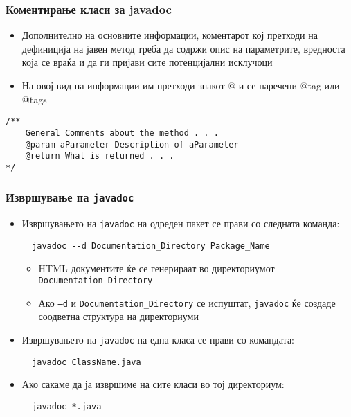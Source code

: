 \begin{frame}[fragile]\frametitle{Коментирање класи за javadoc}

\begin{itemize}
\item
  Дополнително на основните информации, коментарот кој претходи на дефиниција
  на јавен метод треба да содржи опис на параметрите, вредноста која се враќа
  и да ги пријави сите потенцијални исклучоци
\item
  На овој вид на информации им претходи знакот @ и се наречени @tag или @tags
\end{itemize}
\begin{lstlisting}
/** 
	General Comments about the method . . . 
    @param aParameter Description of aParameter 
    @return What is returned . . .
*/
\end{lstlisting}  
\end{frame}

\begin{frame}[fragile]\frametitle{Извршување на \texttt{javadoc}}

\begin{itemize}
\item
  Извршувањето на \texttt{javadoc} на одреден пакет се прави со следната
  команда: 
  \begin{verbatim}
  javadoc --d Documentation_Directory Package_Name
  \end{verbatim}
  \begin{itemize}
  \item
    HTML документите ќе се генерираат во директориумот \texttt{Documentation\_Directory}
  \item
    Ако \texttt{--d} и \texttt{Documentation\_Directory} се испуштат,
    \texttt{javadoc} ќе создаде соодветна структура на директориуми
  \end{itemize}
\item
  Извршувањето на \texttt{javadoc} на една класа се прави со командата:
  \begin{verbatim}
  javadoc ClassName.java
  \end{verbatim}
\item
  Ако сакаме да ја извршиме на сите класи во тој директориум:
 \begin{verbatim}
  javadoc *.java
  \end{verbatim}
\end{itemize}

\end{frame}
